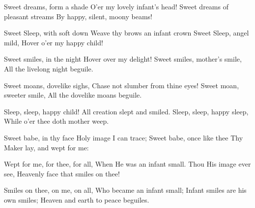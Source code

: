 
\begin{poem}

\begin{stanza}
Sweet dreams, form a shade\verseline
O'er my lovely infant's head!\verseline
Sweet dreams of pleasant streams\verseline
By happy, silent, moony beams!
\end{stanza}
\begin{stanza}
Sweet Sleep, with soft down\verseline
Weave thy brows an infant crown\verseline
Sweet Sleep, angel mild,\verseline
Hover o'er my happy child!
\end{stanza}
\begin{stanza}
Sweet smiles, in the night\verseline
Hover over my delight!\verseline
Sweet smiles, mother's smile,\verseline
All the livelong night beguile.
\end{stanza}
\begin{stanza}
Sweet moans, dovelike sighs,\verseline
Chase not slumber from thine eyes!\verseline
Sweet moan, sweeter smile,\verseline
All the dovelike moans beguile.
\end{stanza}
\begin{stanza}
Sleep, sleep, happy child!\verseline
All creation slept and smiled.\verseline
Sleep, sleep, happy sleep,\verseline
While o'er thee doth mother weep.
\end{stanza}
\begin{stanza}
Sweet babe, in thy face\verseline
Holy image I can trace;\verseline
Sweet babe, once like thee\verseline
Thy Maker lay, and wept for me:
\end{stanza}
\begin{stanza}
Wept for me, for thee, for all,\verseline
When He was an infant small.\verseline
Thou His image ever see,\verseline
Heavenly face that smiles on thee!
\end{stanza}
\begin{stanza}
Smiles on thee, on me, on all,\verseline
Who became an infant small;\verseline
Infant smiles are his own smiles;\verseline
Heaven and earth to peace beguiles.
\end{stanza}

\end{poem}

